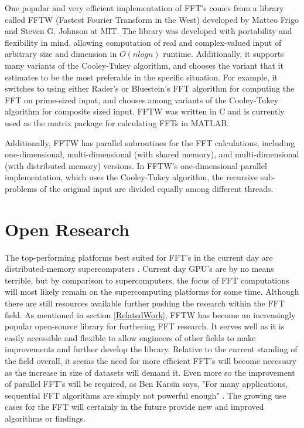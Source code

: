 \documentclass[journal]{IEEEtran}
\begin{document}
	\cite{Beaudoin}
	\par{
		One popular and very efficient implementation of FFT's comes from a library
		called FFTW (Fastest Fourier Transform in the West) developed by Matteo 
		Frigo and Steven G. Johnson at MIT. The library was developed with
		portability and flexibility in mind, allowing computation of real and
		complex-valued input of arbitrary size and dimension in $O(nlogn)$ runtime.
		Additionally, it supports many variants of the Cooley-Tukey algorithm,
		and chooses the variant that it estimates to be the most preferable in
		the specific situation. For example, it switches to using either Rader's
		or Bluestein's FFT algorithm for computing the FFT on prime-sized input, and
		chooses among variants of the Cooley-Tukey algorithm for composite sized
		input. FFTW was written in C and is currently used as the matrix package
		for calculating FFTs in MATLAB.

		Additionally, FFTW has parallel subroutines for the FFT calculations,
		including one-dimensional, multi-dimensional (with shared memory), and
		multi-dimensional (with distributed memory) versions. In FFTW's
		one-dimensional parallel implementation, which uses the Cooley-Tukey
		algorithm, the recursive sub-problems of the original input are divided
		equally among different threads.
		\cite{FFTW}
	}
\section{Open Research}
	\par{
		The top-performing platforms best suited for FFT's in the current day are 
		distributed-memory supercomputers \cite{FFTLitReview}. Current day GPU's 
		are by no means terrible, but by comparison to supercomputers,
		the focus of FFT computations will most likely remain on the supercomputing 
		platforms for some time. Although there are still resources available further 
		pushing the research within the FFT field. As mentioned in section \ref{RelatedWork}, FFTW
		has become an increasingly popular open-source library for furthering FFT research.
		It serves well as it is easily accessible and flexible to allow engineers of other
		fields to make improvements and further develop the library. Relative to the 
		current standing of the field overall, it seems the need for more efficient FFT's 
		will become necessary as the increase in size of datasets will demand it. Even more so 
		the improvement of parallel FFT's will be required, as Ben Karsin says,
		"For many applications, sequential FFT algorithms are simply not powerful enough" \cite{FFTLitReview}.
		The growing use cases for the FFT will certainly in the future provide new and improved 
		algorithms or findings.
	}
\end{document}
